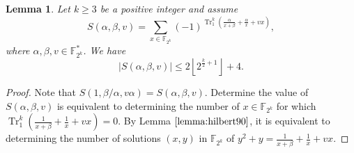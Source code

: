 \documentclass{article}
\newcommand{\F}{\mathbb{F}}
\newcommand{\0}{\textbf{0}}
\newcommand{\1}{\textbf{1}}
\newcommand{\TRACE}{\operatorname{Tr}_1^k}
\theoremstyle{plain}
\newtheorem{lemma}{Lemma}
\begin{document}
    \begin{lemma}\label{lemma:charactersums}
        Let $k\ge 3$ be a positive integer and assume 
        \[S(\alpha,\beta,v)=\sum_{x\in\F_{2^k}}(-1)^{\TRACE\left( \frac{\alpha}{x+\beta}+\frac{\alpha}{x}+vx \right)},\]
        where $\alpha,\beta,v\in\F_{2^k}^*$. 
        We have 
        \[\left\lvert S(\alpha,\beta,v)\right\rvert\le 2\left\lfloor 2^{\frac{k}{2}+1}\right\rfloor+4 .\]
    \end{lemma}
    \begin{proof}
        Note that $S(1,\beta/\alpha,v\alpha)=S(\alpha,\beta,v)$.
        Determine the value of $S(\alpha,\beta,v)$ is equivalent to determining the number of $x\in\F_{2^k}$ 
        for which $\TRACE\left( \frac{1}{x+\beta}+\frac{1}{x}+vx \right)=0$. 
        By Lemma $\ref{lemma:hilbert90}$, it is equivalent to determining the number of solutions $(x,y)$ 
        in $\F_{2^k}$ of $y^2+y=\frac{1}{x+\beta}+\frac{1}{x}+vx$.
        

\end{proof}
\end{document}
